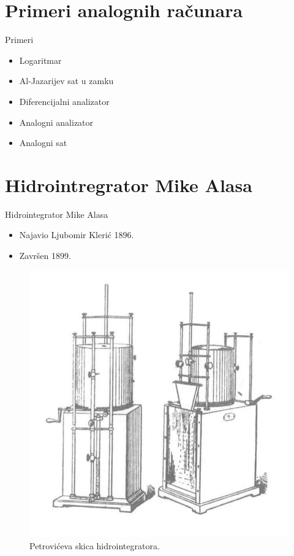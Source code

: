 \documentclass[14pt]{beamer}
\begin{document}
\section{Primeri analognih računara}
\begin{frame}{Primeri}
	\begin{itemize}
		\item Logaritmar
		\item Al-Jazarijev sat u zamku
 		\item Diferencijalni analizator
		\item Analogni analizator
		\item Analogni sat
	\end{itemize}
\end{frame}

\section{Hidrointregrator Mike Alasa}
\begin{frame}{Hidrointegrator Mike Alasa}
\begin{itemize}
    \item Najavio Ljubomir Klerić 1896.
    \item Završen 1899.
\end{itemize}
\begin{figure}[h!]
\begin{center}
\includegraphics[scale=0.6]{h1.jpg}
\end{center}
\caption{Petrovićeva skica hidrointegratora. }
\label{fig:h1}
\end{figure}
    
\end{frame}
\end{document}
